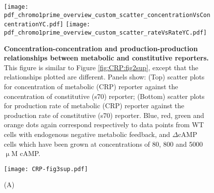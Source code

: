 \begin{figure}
	\centering
	\texttt{[image: pdf\_chromo1prime\_overview\_custom\_scatter\_concentrationVsConcentrationYC.pdf]}
	\texttt{[image: pdf\_chromo1prime\_overview\_custom\_scatter\_rateVsRateYC.pdf]}	
	\caption{ 
		\textbf{Concentration-concentration and production-production relationships between metabolic and constitutive reporters.}
		This figure is similar to Figure \ref{fig:CRP:fig2sup}, except that the relationships plotted are different.
		Panels show: (Top) scatter plots for concentration of metabolic (CRP) reporter against the concentration of constitutive (s70) reporter; 
		(Bottom) scatter plots for production rate of metabolic (CRP) reporter against the production rate of constitutive (s70) reporter.
		Blue, red, green and orange dots again correspond respectively to data points from WT cells with endogenous negative metabolic feedback, and $\Delta$cAMP cells which have been grown at concentrations of 80, 800 and 5000 $\upmu$M cAMP.
	}
	\label{fig:CRP:fig3scatters_CC_pp}
\end{figure}




\begin{figure}
	\centering
	\texttt{[image: CRP-fig3sup.pdf]}
	\caption{ 
		(A) 
	}
	\label{fig:CRP:fig3sup}
\end{figure}


